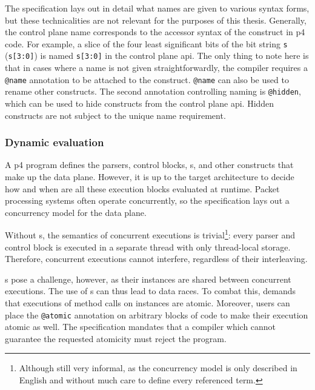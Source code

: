 The \pfs specification lays out in detail what names are given to various syntax
forms, but these technicalities are not relevant for the purposes of this
thesis. Generally, the control plane name corresponds to the accessor syntax of
the construct in \acrshort{p4} code. For example, a slice of the four least
significant bits of the bit string \texttt{s} (\texttt{s[3:0]}) is named
\texttt{s[3:0]} in the control plane \acrshort{api}. The only thing to note here
is that in cases where a name is not given straightforwardly, the compiler
requires a \texttt{@name} annotation to be attached to the construct.
\texttt{@name} can also be used to rename other constructs. The second
annotation controlling naming is \texttt{@hidden}, which can be used to hide
constructs from the control plane \acrshort{api}. Hidden constructs are not
subject to the unique name requirement.

\subsubsection*{Dynamic evaluation}

A \acrshort{p4} program defines the parsers, control blocks, \extern{}s, and
other constructs that make up the data plane. However, it is up to the target
architecture to decide how and when are all these execution blocks evaluated at
runtime. Packet processing systems often operate concurrently, so the \pfs
specification lays out a concurrency model for the data plane.

Without \extern{}s, the semantics of concurrent executions is
trivial\footnote{Although still very informal, as the concurrency model is only
described in English and without much care to define every referenced term.}:
every parser and control block is executed in a separate thread with only
thread-local storage. Therefore, concurrent executions cannot interfere,
regardless of their interleaving.

\extern{}s pose a challenge, however, as their instances are shared between
concurrent executions. The use of \extern{}s can thus lead to data races. To
combat this, \pfs demands that executions of method calls on \extern{} instances
are atomic. Moreover, users can place the \texttt{@atomic} annotation on
arbitrary blocks of code to make their execution atomic as well. The
specification mandates that a compiler which cannot guarantee the requested
atomicity must reject the program.
